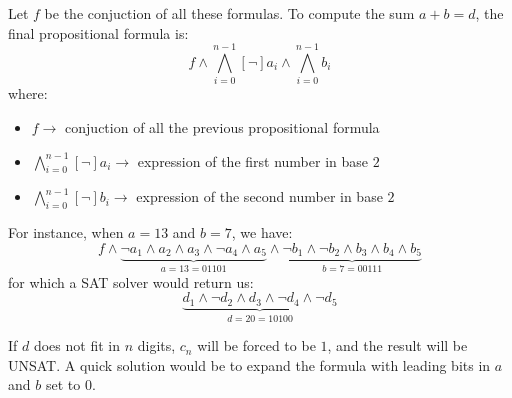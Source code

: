 \begin{example}
    Let $f$ be the conjuction of all these formulas. To compute the sum $a + b = d$, the final propositional formula is:
    $$ f \wedge \bigwedge_{i=0}^{n-1} [\neg] a_i \wedge \bigwedge_{i=0}^{n-1} b_i $$
    where:
    \begin{itemize}
        \renewcommand{\labelitemi}{-}
        \item $f \rightarrow$ conjuction of all the previous propositional formula
        \item $\bigwedge_{i=0}^{n-1} [\neg] a_i \rightarrow$ expression of the first number in base $2$
        \item $\bigwedge_{i=0}^{n-1} [\neg] b_i \rightarrow$ expression of the second number in base $2$
    \end{itemize} \vspace{7pt}

    For instance, when $a = 13$ and $b = 7$, we have:
    $$ f \wedge \underbrace{\neg a_1 \wedge a_2 \wedge a_3 \wedge \neg a_4 \wedge a_5}_{a = 13 = 01101} \wedge \underbrace{\neg b_1 \wedge \neg b_2 \wedge b_3 \wedge b_4 \wedge b_5}_{b = 7 = 00111} $$
    for which a SAT solver would return us:
    $$ \underbrace{d_1 \wedge \neg d_2 \wedge d_3 \wedge \neg d_4 \wedge \neg d_5}_{d = 20 = 10100} $$

    If $d$ does not fit in $n$ digits, $c_n$ will be forced to be $1$, and the result will be UNSAT. A quick solution would be to expand the formula with 
    leading bits in $a$ and $b$ set to $0$.
\end{example}